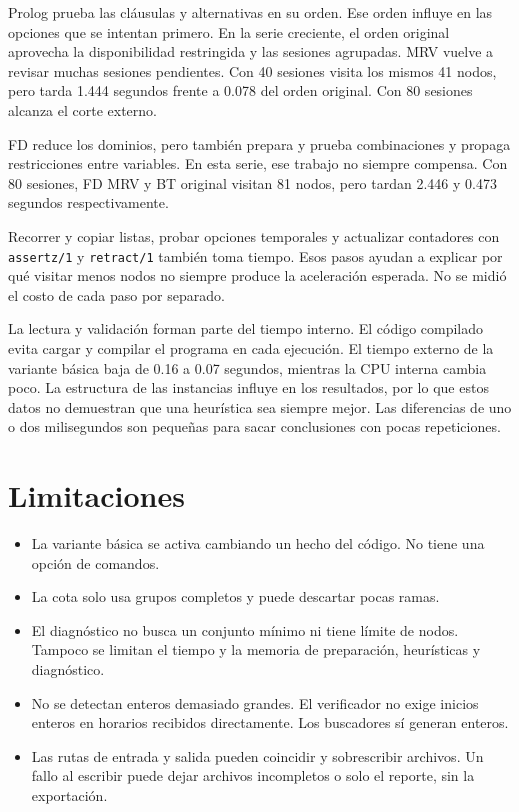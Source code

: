 \documentclass[11pt]{article}
\begin{document}
Prolog prueba las cláusulas y alternativas en su orden. Ese orden influye en las opciones que se intentan primero. En la serie creciente, el orden original aprovecha la disponibilidad restringida y las sesiones agrupadas. MRV vuelve a revisar muchas sesiones pendientes. Con 40 sesiones visita los mismos 41 nodos, pero tarda 1.444 segundos frente a 0.078 del orden original. Con 80 sesiones alcanza el corte externo.

FD reduce los dominios, pero también prepara y prueba combinaciones y propaga restricciones entre variables. En esta serie, ese trabajo no siempre compensa. Con 80 sesiones, FD MRV y BT original visitan 81 nodos, pero tardan 2.446 y 0.473 segundos respectivamente.

Recorrer y copiar listas, probar opciones temporales y actualizar contadores con \texttt{assertz/1} y \texttt{retract/1} también toma tiempo. Esos pasos ayudan a explicar por qué visitar menos nodos no siempre produce la aceleración esperada. No se midió el costo de cada paso por separado.

La lectura y validación forman parte del tiempo interno. El código compilado evita cargar y compilar el programa en cada ejecución. El tiempo externo de la variante básica baja de 0.16 a 0.07 segundos, mientras la CPU interna cambia poco. La estructura de las instancias influye en los resultados, por lo que estos datos no demuestran que una heurística sea siempre mejor. Las diferencias de uno o dos milisegundos son pequeñas para sacar conclusiones con pocas repeticiones.

\section{Limitaciones}

\begin{itemize}
    \item La variante básica se activa cambiando un hecho del código. No tiene una opción de comandos.
    \item La cota solo usa grupos completos y puede descartar pocas ramas.
    \item El diagnóstico no busca un conjunto mínimo ni tiene límite de nodos. Tampoco se limitan el tiempo y la memoria de preparación, heurísticas y diagnóstico.
    \item No se detectan enteros demasiado grandes. El verificador no exige inicios enteros en horarios recibidos directamente. Los buscadores sí generan enteros.
    \item Las rutas de entrada y salida pueden coincidir y sobrescribir archivos. Un fallo al escribir puede dejar archivos incompletos o solo el reporte, sin la exportación.
\end{itemize}
\end{document}
